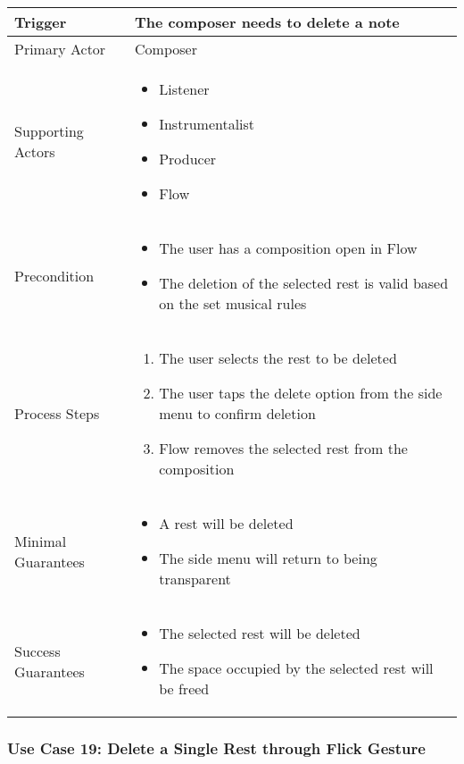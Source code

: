 \begin{tabularx}{\textwidth}{|X|X|}
\hline
Trigger & 
The composer needs to delete a note \\
\hline
Primary Actor & 
Composer\\
\hline
Supporting Actors & 
\begin{itemize}
\item Listener
\item Instrumentalist
\item Producer
\item Flow
\end{itemize} \\
\hline
Precondition & 
\begin{itemize}
\item The user has a composition open in Flow 
\item The deletion of the selected rest is valid based on the set musical rules
\end{itemize} \\
\hline
Process Steps & 
\begin{enumerate}
\item The user selects the rest to be deleted 
\item The user taps the delete option from the side menu to confirm deletion
\item Flow removes the selected rest from the composition
\end{enumerate} \\
\hline
Minimal Guarantees & 
\begin{itemize}
  \item A rest will be deleted
  \item The side menu will return to being transparent
\end{itemize} \\
\hline
Success Guarantees & 
\begin{itemize}
  \item The selected rest will be deleted
  \item The space occupied by the selected rest will be freed
\end{itemize} \\
\hline
\end{tabularx}

\subsubsection{Use Case 19: Delete a Single Rest through Flick Gesture}

